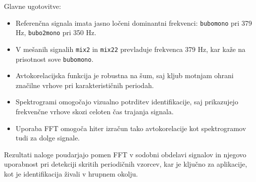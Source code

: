 \documentclass[12pt,a4paper]{article}
\begin{document}
Glavne ugotovitve:
\begin{itemize}
    \item Referenčna signala imata jasno ločeni dominantni frekvenci: \texttt{bubomono} pri 379 Hz, \texttt{bubo2mono} pri 350 Hz.
    \item V mešanih signalih \texttt{mix2} in \texttt{mix22} prevladuje frekvenca 379 Hz, kar kaže na prisotnost sove \texttt{bubomono}.
    \item Avtokorelacijska funkcija je robustna na šum, saj kljub motnjam ohrani značilne vrhove pri karakterističnih periodah.
    \item Spektrogrami omogočajo vizualno potrditev identifikacije, saj prikazujejo frekvenčne vrhove skozi celoten čas trajanja signala.
    \item Uporaba FFT omogoča hiter izračun tako avtokorelacije kot spektrogramov tudi za dolge signale.
\end{itemize}

Rezultati naloge poudarjajo pomen FFT v sodobni obdelavi signalov in njegovo uporabnost pri detekciji skritih periodičnih vzorcev, kar je ključno za aplikacije, kot je identifikacija živali v hrupnem okolju.
\end{document}

